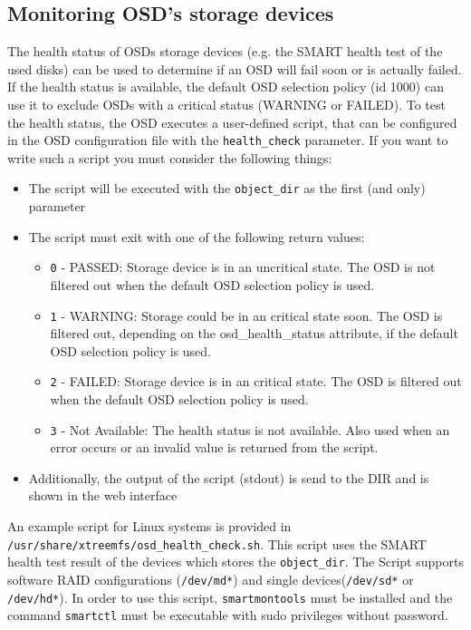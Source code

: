 \documentclass[a4paper,10pt]{book}
\begin{document}
\subsection{Monitoring OSD's storage devices}
\label{sec:osd-health-script}
The health status of OSDs storage devices (e.g. the SMART health test of the
used disks) can be used to determine if an OSD will fail soon or is actually
failed. If the health status is available, the default OSD selection policy
(id 1000) can use it to exclude OSDs with a critical status (WARNING or
FAILED). To test the health status, the OSD executes a user-defined script, that
can be configured in the OSD configuration file with the \texttt{health\_check}
parameter. If you want to write such a script you must consider the following
things:

\begin{itemize}
\item The script will be executed with the \texttt{object\_dir} as the first
(and only) parameter
\item The script must exit with one of the following return values:
\begin{itemize}
\item \texttt{0} - PASSED: Storage device is in an uncritical state. The OSD
is not filtered out when the default OSD selection policy is used.
\item \texttt{1} - WARNING: Storage could be in an critical state soon. The OSD
is filtered out, depending on the osd\_health\_status attribute, if the
default OSD selection policy is used.
\item \texttt{2} - FAILED: Storage device is in an critical state. The OSD is
filtered out when the default OSD selection policy is used.
\item \texttt{3} - Not Available: The health status is not available. Also used
when an error occurs or an invalid value is returned from the script.
\end{itemize}
\item Additionally, the output of the script (stdout) is send to the DIR and is
shown in the web interface
\end{itemize}
An example script for Linux systems is provided in
\texttt{/usr/share/xtreemfs/osd\_health\_check.sh}. This script uses the SMART
health test result of the devices which stores the \texttt{object\_dir}. The
Script supports software RAID configurations (\texttt{/dev/md*}) and single
devices(\texttt{/dev/sd*} or \texttt{/dev/hd*}). In order to use this script,
\texttt{smartmontools} must be installed and the command \texttt{smartctl} must
be executable with sudo privileges without password.
\end{document}
